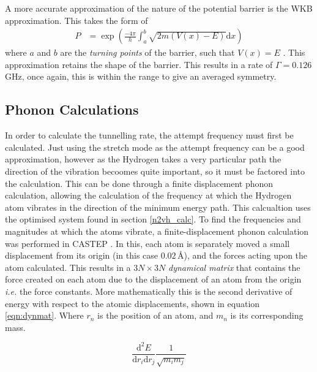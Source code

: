 \documentclass[10pt,a4paper,twocolumn,twoside]{extarticle}
\renewcommand{\d}{\text{d}}
\begin{document}
A more accurate approximation of the nature of the potential barrier is the WKB approximation. This takes the form of 
\begin{align}
    P &= \exp(\frac{-4\pi}{h}\int_{a}^{b}\sqrt{2m(V(x)-E)}{\d}x)
\end{align}
where $a$ and $b$ are the \emph{turning points} of the barrier, such that $V(x) = E$ \cite{butorac}. This approximation retains the shape of the barrier. This results in a rate of $\Gamma = 0.126$\,GHz, once again, this is within the range to give an averaged symmetry. 


\subsection{Phonon Calculations}
\label{phonon}
In order to calculate the tunnelling rate, the attempt frequency must first be calculated. Just using the stretch mode as the attempt frequency can be a good approximation, however as the Hydrogen takes a very particular path the direction of the vibration becoomes quite important, so it must be factored into the calculation.
This can be done through a finite displacement phonon calculation, allowing the calculation of the frequency at which the Hydrogen atom vibrates in the direction of the minimum energy path. This calcualtion uses the optimised system found in section \ref{n2vh_calc}. To find the frequencies and magnitudes at which the atoms vibrate, a finite-displacement phonon calculation was performed in CASTEP \cite{DynamicalMatrix}. In this, each atom is separately moved a small displacement from its origin (in this case $0.02$\,{\AA}), and the forces acting upon the atom calculated. This results in a $3N\times3N$ \emph{dynamical matrix} that contains the force created on each atom due to the displacement of an atom from the origin \emph{i.e.} the force constants. More mathematically this is the second derivative of energy with respect to the atomic displacements, shown in equation \ref{eqn:dynmat}. Where $r_n$ is the position of an atom, and $m_n$ is its corresponding mass.

\begin{equation}
	\label{eqn:dynmat}
	\frac{\d^2E}{ {\d}r_i {\d}r_j} \frac{1}{\sqrt{m_i m_j}}
\end{equation}
\end{document}
